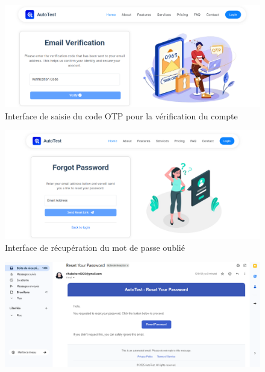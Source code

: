 \begin{justify}
\begin{enumerate}[label=\Alph*.]
\begin{figure}[H]
                    \label{fig:email-verif}
                \end{figure}
                \vspace{-0.6cm}
                \begin{figure}[H]
                    \centering
                    \includegraphics[width=\linewidth]{chapitres/ch3Sp1/section/sprint1/img/interface/email-verification.png}
                    \caption{\centering Interface de saisie du code OTP pour la vérification du compte}
                    \label{fig:email-verification}
                \end{figure}
                \vspace{-0.6cm}
                \begin{figure}[H]
                    \centering
                    \includegraphics[width=\linewidth]{chapitres/ch3Sp1/section/sprint1/img/interface/forgot-password.png}
                    \caption{\centering Interface de récupération du mot de passe oublié}
                    \label{fig:forgot-password}
                \end{figure}
                \vspace{-0.6cm}
                \begin{figure}[H]
                    \centering
                    \includegraphics[width=\linewidth]{chapitres/ch3Sp1/section/sprint1/img/interface/reset-password-email.png}

\end{figure}
\end{enumerate}
\end{justify}
